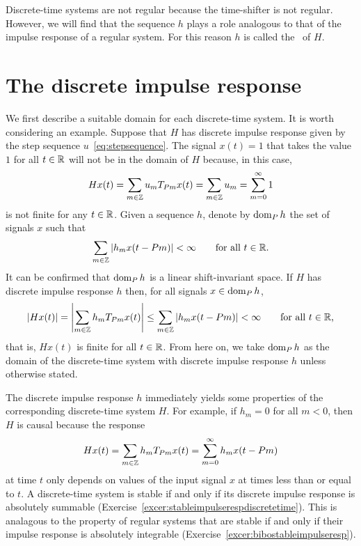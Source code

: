Discrete-time systems are not regular because the time-shifter is not regular.  However, we will find that the sequence $h$ plays a role analogous to that of the impulse response of a regular system.  For this reason $h$ is called the~ of $H$.


\section{The discrete impulse response} \label{sec:discr-time-impulse}

We first describe a suitable domain for each discrete-time system.  It is worth considering an example.  Suppose that $H$ has discrete impulse response given by the step sequence $u$~\eqref{eq:stepsequence}.  The signal $x(t) = 1$ that takes the value $1$ for all $t \in {\mathbb R}$ will not be in the domain of $H$ because, in this case,
\[
Hx(t) =  \sum_{m \in {\mathbb Z}} u_m T_{ P m} x(t) = \sum_{m \in {\mathbb Z}} u_m = \sum_{m=0}^\infty 1
\]
is not finite for any $t \in {\mathbb R}$.  Given a sequence $h$, denote by $\operatorname{dom}_P h$ the set of signals $x$ such that
\[
\sum_{m \in {\mathbb Z}} \left\vert h_m x(t - Pm) \right\vert < \infty \qquad \text{for all $t \in {\mathbb R}$}.
\]
It can be confirmed that $\operatorname{dom}_P h$ is a linear shift-invariant space.  If $H$ has discrete impulse response $h$ then, for all signals $x \in \operatorname{dom}_P h$,
\[
\left\vert Hx(t) \right\vert = \left\vert \sum_{m \in {\mathbb Z}} h_m T_{ P m} x(t) \right\vert \leq \sum_{m \in {\mathbb Z}}  \left\vert  h_m x(t - Pm) \right\vert < \infty \qquad \text{for all $t \in {\mathbb R}$,}
\]
that is, $Hx(t)$ is finite for all $t \in {\mathbb R}$.  From here on, we take $\operatorname{dom}_P h$ as the domain of the discrete-time system with discrete impulse response $h$ unless otherwise stated.  %

The discrete impulse response $h$ immediately yields some properties of the corresponding discrete-time system $H$.  For example, if $h_m = 0$ for all $m < 0$, then $H$ is causal because the response 
\[
Hx(t) = \sum_{m \in {\mathbb Z}} h_m T_{ P m}x(t) = \sum_{m =0}^\infty h_m x(t - Pm)
\] 
at time $t$ only depends on values of the input signal $x$ at times less than or equal to $t$.  A discrete-time system is stable if and only if its discrete impulse response is absolutely summable (Exercise~\ref{excer:stableimpulserespdiscretetime}).  This is analagous to the property of regular systems that are stable if and only if their impulse response is absolutely integrable (Exercise~\ref{excer:bibostableimpulseresp}).

